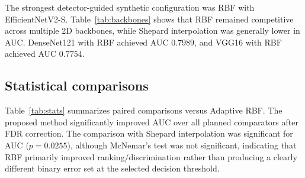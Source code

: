 \documentclass[preprint,12pt]{elsarticle}
\begin{document}
The strongest detector-guided synthetic configuration was RBF with EfficientNetV2-S. Table~\ref{tab:backbones} shows that RBF remained competitive across multiple 2D backbones, while Shepard interpolation was generally lower in AUC. DenseNet121 with RBF achieved AUC $0.7989$, and VGG16 with RBF achieved AUC $0.7754$.

\begin{table}[t]
\centering
\caption{Backbone comparison for detector-guided synthetic images generated with threshold $0.50$ and top-$4$ detections.}
\label{tab:backbones}
\end{table}

\subsection{Statistical comparisons}

Table~\ref{tab:stats} summarizes paired comparisons versus Adaptive RBF. The proposed method significantly improved AUC over all planned comparators after FDR correction. The comparison with Shepard interpolation was significant for AUC ($p=0.0255$), although McNemar's test was not significant, indicating that RBF primarily improved ranking/discrimination rather than producing a clearly different binary error set at the selected decision threshold.
\end{document}
